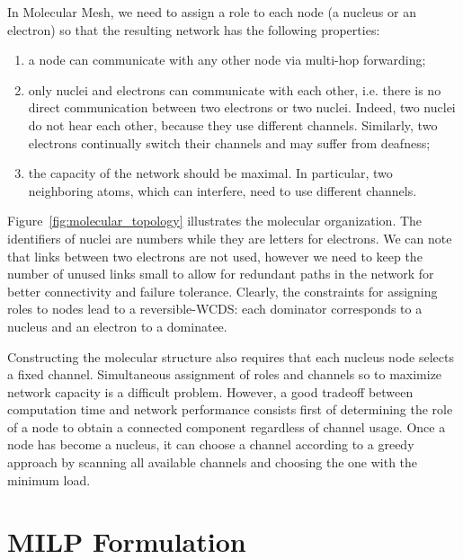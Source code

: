 \documentclass[twoside]{article}
\begin{document}
In Molecular Mesh, we need to assign a role to each node (a nucleus or
an electron) so that the resulting network has the following
properties:
\begin{enumerate}
	\item a node can communicate with any other node via multi-hop forwarding;
	\item only nuclei and electrons can communicate with each
          other, i.e. there is no direct communication between two electrons
          or two nuclei. Indeed, two nuclei do not hear each other,
          because they use different channels. Similarly, two
          electrons continually switch their channels and may suffer
          from deafness;
	\item the capacity of the network should be maximal. In particular, two neighboring atoms, which can interfere, need to use different channels.
\end{enumerate}

Figure~\ref{fig:molecular_topology} illustrates the molecular
organization. The identifiers of nuclei are numbers while they are
letters for electrons. We can note that links between two electrons
are not used, however we need to keep the number of unused links small
to allow for redundant paths in the network for better connectivity
and failure tolerance. 
Clearly, the constraints for assigning roles to nodes lead to a
reversible-WCDS: each dominator corresponds to a nucleus and an
electron to a dominatee.

Constructing the molecular structure also requires that each nucleus
node selects a fixed channel. Simultaneous assignment of roles and
channels so to maximize network capacity is a difficult
problem. However, a good tradeoff between computation time and network
performance consists first of determining the role of a node to obtain
a connected component regardless of channel usage. Once a node has
become a nucleus, it can choose a channel according to a greedy
approach by scanning all available channels and choosing the one with
the minimum load.













\section{MILP Formulation}
\label{section:milp}
\end{document}
